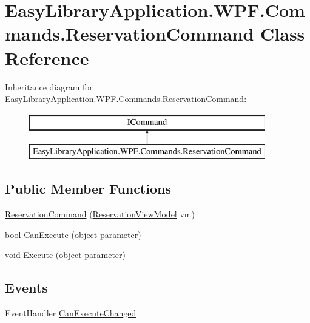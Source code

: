 \hypertarget{class_easy_library_application_1_1_w_p_f_1_1_commands_1_1_reservation_command}{}\section{Easy\+Library\+Application.\+W\+P\+F.\+Commands.\+Reservation\+Command Class Reference}
\label{class_easy_library_application_1_1_w_p_f_1_1_commands_1_1_reservation_command}
Inheritance diagram for Easy\+Library\+Application.\+W\+P\+F.\+Commands.\+Reservation\+Command\+:\begin{figure}[H]
\begin{center}
\leavevmode
\includegraphics[height=2.000000cm]{class_easy_library_application_1_1_w_p_f_1_1_commands_1_1_reservation_command}
\end{center}
\end{figure}
\subsection*{Public Member Functions}
\begin{DoxyCompactItemize}
\item 
\mbox{\hyperlink{class_easy_library_application_1_1_w_p_f_1_1_commands_1_1_reservation_command_a6668e7c464504f1a90752e1d63ffdae6}{Reservation\+Command}} (\mbox{\hyperlink{class_easy_library_application_1_1_w_p_f_1_1_view_model_1_1_reservation_view_model}{Reservation\+View\+Model}} vm)
\item 
bool \mbox{\hyperlink{class_easy_library_application_1_1_w_p_f_1_1_commands_1_1_reservation_command_a4cabdcbcd38983b51567f190f55734ff}{Can\+Execute}} (object parameter)
\item 
void \mbox{\hyperlink{class_easy_library_application_1_1_w_p_f_1_1_commands_1_1_reservation_command_a30b53d08bee375eefac9a402a73d6603}{Execute}} (object parameter)
\end{DoxyCompactItemize}
\subsection*{Events}
\begin{DoxyCompactItemize}
\item 
Event\+Handler \mbox{\hyperlink{class_easy_library_application_1_1_w_p_f_1_1_commands_1_1_reservation_command_af07e46820627fd626ac2f0f2be9a4f66}{Can\+Execute\+Changed}}
\end{DoxyCompactItemize}


